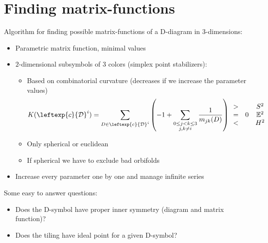 \section{Finding matrix-functions}
\begin{frame}
  Algorithm for finding possible matrix-functions of a D-diagram in
  $3$-dimensions:
  \begin{itemize}
    \item Parametric matrix function, minimal values
    \item $2$-dimensional subsymbols of 3 colors (simplex point stabilizers):
      \begin{itemize}
	\item Based on combinatorial curvature (decreases if we increase the
	  parameter values)
	  \begin{align*}
	    K(\leftexp{c}{\mathcal{D}}^i)=\sum_{D\in
	    \leftexp{c}{\mathcal{D}}^i}\left(-1+\sum_{\substack{0\le j<k\le 3 \\
	    j,k\ne i}}\frac{1}{m_{jk}(D)}\right)
	    \begin{array}{cccc}
	      > & & S^2 \\
	      = & 0 & \mathbb{E}^2 \\
	      < & & H^2
	    \end{array}
	  \end{align*}
	\item Only spherical or euclidean
	\item If spherical we have to exclude bad orbifolds
      \end{itemize}
    \item Increase every parameter one by one and manage infinite series
  \end{itemize}
  Some easy to answer questions:
  \begin{itemize}
    \item Does the D-symbol have proper inner symmetry (diagram and matrix function)?
    \item Does the tiling have ideal point for a given D-symbol?
  \end{itemize}
\end{frame}

